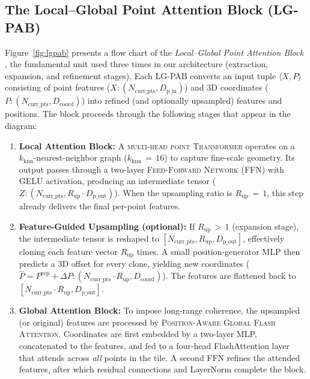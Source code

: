 \documentclass[12pt]{report}
\begin{document}
\subsection{The Local–Global Point Attention Block (LG-PAB)}
\label{sec:lgpab}



Figure~\ref{fig:lgpab} presents a flow chart of the \emph{Local–Global Point Attention Block
}, the fundamental unit used three times in our architecture (extraction, expansion, and refinement stages). Each LG-PAB converts an input tuple $\langle X, P \rangle$ consisting of point features ($X: (N_{\text{curr\_pts}}, D_{\text{p\_in}})$) and 3D coordinates ($P: (N_{\text{curr\_pts}}, D_{\text{coord}})$) into refined (and optionally upsampled) features and positions. The block proceeds through the following stages that appear in the diagram:

\begin{enumerate}[leftmargin=*]
\item \textbf{Local Attention Block:}
      A
      \textsc{multi-head point Transformer} operates on a $k_{\text{knn}}$-nearest-neighbor graph ($k_{\text{knn}}\,{=}\,16$) to capture fine-scale geometry. Its output passes through a two-layer \textsc{Feed-Forward Network} (FFN) with GELU activation, producing an intermediate tensor
      ($Z: (N_{\text{curr\_pts}}, R_{\text{up}} \cdot D_{\text{p\_out}})$). When the upsampling ratio is $R_{\text{up}}\,{=}\,1$, this step already delivers the final per-point features.

\item[\emph{2\,a}] \textbf{Feature-Guided Upsampling (optional):
}
      If $R_{\text{up}}\,{>}\,1$ (expansion stage), the intermediate tensor is reshaped to $[N_{\text{curr\_pts}}, R_{\text{up}}, D_{\text{p\_out}}]$, effectively cloning each feature vector $R_{\text{up}}$ times.
      A small position-generator MLP then predicts a 3D offset for every clone, yielding new coordinates
      ($\hat{P} = P^{\text{rep}} + \Delta P: (N_{\text{curr\_pts}} \cdot R_{\text{up}}, D_{\text{coord}})$).
      The features are flattened back to $[N_{\text{curr\_pts}} \cdot R_{\text{up}}, D_{\text{p\_out}}]$.

\item \textbf{Global Attention Block:}
      To impose long-range coherence, the upsampled (or original) features are processed by
      \textsc{Position-Aware Global Flash Attention}. Coordinates are first embedded by a two-layer MLP, concatenated to the features, and fed to a four-head FlashAttention layer that attends across \emph{all} points in the tile. A second FFN refines the attended features, after which residual connections and LayerNorm complete the block.
\end{enumerate}
\end{document}
